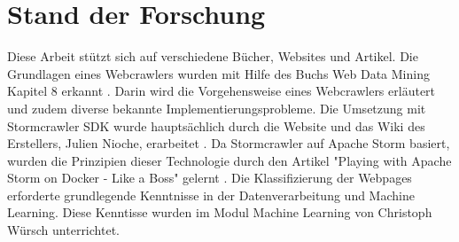 \chapter{Stand der Forschung}
Diese Arbeit stützt sich auf verschiedene Bücher, Websites und Artikel.
Die Grundlagen eines Webcrawlers wurden mit Hilfe des Buchs \glqq Web Data Mining\grqq{} Kapitel 8 erkannt \cite{liu2007web}. 
Darin wird die Vorgehensweise eines Webcrawlers erläutert und zudem diverse bekannte Implementierungsprobleme.
Die Umsetzung mit Stormcrawler SDK wurde hauptsächlich durch die Website und das Wiki des Erstellers, Julien Nioche, erarbeitet \cite{StormCrawler} \cite{GithubStormCrawler}.
Da Stormcrawler auf Apache Storm basiert, wurden die Prinzipien dieser Technologie durch den Artikel "Playing with Apache Storm on Docker - Like a Boss" gelernt \cite{ApacheStormDev}.
Die Klassifizierung der Webpages erforderte grundlegende Kenntnisse in der Datenverarbeitung und Machine Learning.
Diese Kenntisse wurden im Modul \glqq Machine Learning\grqq{} von Christoph Würsch unterrichtet. %

